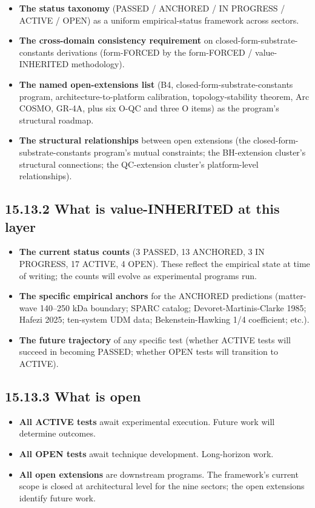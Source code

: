 \documentclass[11pt]{book}
\begin{document}
\begin{itemize}
\item \textbf{The status taxonomy} (PASSED / ANCHORED / IN PROGRESS / ACTIVE / OPEN) as a uniform empirical-status framework across sectors.
\item \textbf{The cross-domain consistency requirement} on closed-form-substrate-constants derivations (form-FORCED by the form-FORCED / value-INHERITED methodology).
\item \textbf{The named open-extensions list} (B4, closed-form-substrate-constants program, architecture-to-platform calibration, topology-stability theorem, Arc COSMO, GR-4A, plus six O-QC and three O items) as the program's structural roadmap.
\item \textbf{The structural relationships} between open extensions (the closed-form-substrate-constants program's mutual constraints; the BH-extension cluster's structural connections; the QC-extension cluster's platform-level relationships).
\end{itemize}

\subsection{15.13.2 What is value-INHERITED at this layer}

\begin{itemize}
\item \textbf{The current status counts} (3 PASSED, 13 ANCHORED, 3 IN PROGRESS, 17 ACTIVE, 4 OPEN). These reflect the empirical state at time of writing; the counts will evolve as experimental programs run.
\item \textbf{The specific empirical anchors} for the ANCHORED predictions (matter-wave 140–250 kDa boundary; SPARC catalog; Devoret-Martinis-Clarke 1985; Hafezi 2025; ten-system UDM data; Bekenstein-Hawking 1/4 coefficient; etc.).
\item \textbf{The future trajectory} of any specific test (whether ACTIVE tests will succeed in becoming PASSED; whether OPEN tests will transition to ACTIVE).
\end{itemize}

\subsection{15.13.3 What is open}

\begin{itemize}
\item \textbf{All ACTIVE tests} await experimental execution. Future work will determine outcomes.
\item \textbf{All OPEN tests} await technique development. Long-horizon work.
\item \textbf{All open extensions} are downstream programs. The framework's current scope is closed at architectural level for the nine sectors; the open extensions identify future work.
\end{itemize}
\end{document}
